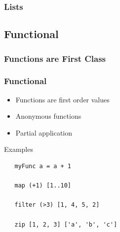 \documentclass{beamer}
\begin{document}
\begin{frame}[fragile]
  \frametitle{Lists}
\end{frame}

\subsection{Functional}
\begin{frame}[fragile]
\frametitle{Functions are First Class}




\end{frame}

\begin{frame}[fragile]
\frametitle{Functional}

 \begin{itemize}
  \item Functions are first order values
  \item Anonymous functions
  \item Partial application
 \end{itemize}

 \vspace{0.5cm}
 \begin{block}{Examples}

  \begin{lstlisting} 
   myFunc a = a + 1
  
   map (+1) [1..10]
  
   filter (>3) [1, 4, 5, 2]
  
   zip [1, 2, 3] ['a', 'b', 'c']
  
  \end{lstlisting}
  
 \end{block}

\end{frame}
\end{document}

